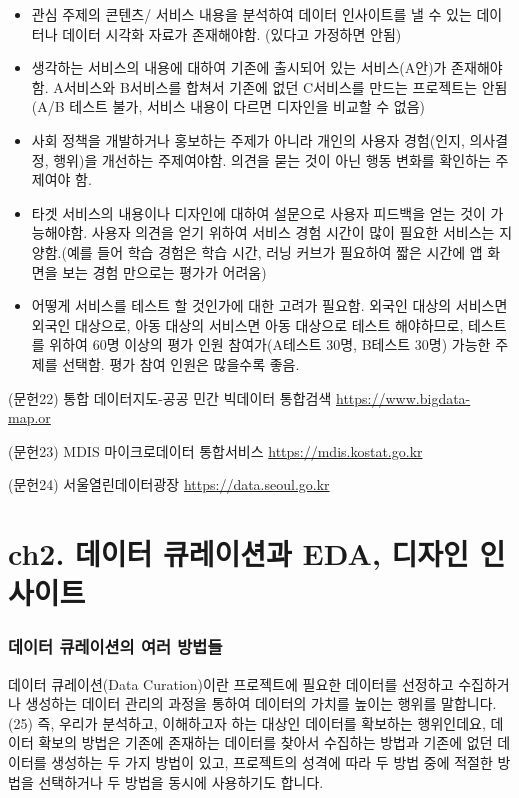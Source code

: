 \documentclass[
  letterpaper,
]{book}
\providecommand{\tightlist}{%
  \setlength{\itemsep}{0pt}\setlength{\parskip}{0pt}}\usepackage{longtable,booktabs,array}
\begin{document}
\begin{itemize}
\tightlist
\item
  관심 주제의 콘텐츠/ 서비스 내용을 분석하여 데이터 인사이트를 낼 수
  있는 데이터나 데이터 시각화 자료가 존재해야함. (있다고 가정하면 안됨)
\item
  생각하는 서비스의 내용에 대하여 기존에 출시되어 있는 서비스(A안)가
  존재해야함. A서비스와 B서비스를 합쳐서 기존에 없던 C서비스를 만드는
  프로젝트는 안됨 (A/B 테스트 불가, 서비스 내용이 다르면 디자인을 비교할
  수 없음)
\item
  사회 정책을 개발하거나 홍보하는 주제가 아니라 개인의 사용자 경험(인지,
  의사결정, 행위)을 개선하는 주제여야함. 의견을 묻는 것이 아닌 행동
  변화를 확인하는 주제여야 함.
\item
  타겟 서비스의 내용이나 디자인에 대하여 설문으로 사용자 피드백을 얻는
  것이 가능해야함. 사용자 의견을 얻기 위하여 서비스 경험 시간이 많이
  필요한 서비스는 지양함.(예를 들어 학습 경험은 학습 시간, 러닝 커브가
  필요하여 짧은 시간에 앱 화면을 보는 경험 만으로는 평가가 어려움)
\item
  어떻게 서비스를 테스트 할 것인가에 대한 고려가 필요함. 외국인 대상의
  서비스면 외국인 대상으로, 아동 대상의 서비스면 아동 대상으로 테스트
  해야하므로, 테스트를 위하여 60명 이상의 평가 인원 참여가(A테스트 30명,
  B테스트 30명) 가능한 주제를 선택함. 평가 참여 인원은 많을수록 좋음.
\end{itemize}

(문헌22) 통합 데이터지도-공공 민간 빅데이터 통합검색
\url{https://www.bigdata-map.or}

(문헌23) MDIS 마이크로데이터 통합서비스 \url{https://mdis.kostat.go.kr}

(문헌24) 서울열린데이터광장 \url{https://data.seoul.go.kr}

\chapter{ch2. 데이터 큐레이션과 EDA, 디자인
인사이트}\label{ch2.-uxb370uxc774uxd130-uxd050uxb808uxc774uxc158uxacfc-eda-uxb514uxc790uxc778-uxc778uxc0acuxc774uxd2b8}

\subsection{데이터 큐레이션의 여러
방법들}\label{uxb370uxc774uxd130-uxd050uxb808uxc774uxc158uxc758-uxc5ecuxb7ec-uxbc29uxbc95uxb4e4}

데이터 큐레이션(Data Curation)이란 프로젝트에 필요한 데이터를 선정하고
수집하거나 생성하는 데이터 관리의 과정을 통하여 데이터의 가치를 높이는
행위를 말합니다.(25) 즉, 우리가 분석하고, 이해하고자 하는 대상인
데이터를 확보하는 행위인데요, 데이터 확보의 방법은 기존에 존재하는
데이터를 찾아서 수집하는 방법과 기존에 없던 데이터를 생성하는 두 가지
방법이 있고, 프로젝트의 성격에 따라 두 방법 중에 적절한 방법을
선택하거나 두 방법을 동시에 사용하기도 합니다.
\end{document}
